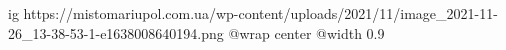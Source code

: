  
 
 
 
 

\ifcmt
  ig https://mistomariupol.com.ua/wp-content/uploads/2021/11/image_2021-11-26_13-38-53-1-e1638008640194.png
  @wrap center
  @width 0.9
\fi
